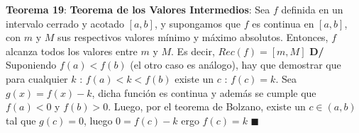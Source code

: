 \documentclass[11pt,a4paper]{article}
\newcommand*{\QEDA}{\null\nobreak\hfill\ensuremath{\blacksquare}}
\begin{document}
\noindent \textbf{Teorema 19}: \textbf{Teorema de los Valores Intermedios}: Sea $f$ definida en un intervalo cerrado y acotado $[a,b]$, y supongamos que $f$ es continua en $[a,b]$, con $m$ y $M$ sus respectivos valores m\'inimo y m\'aximo absolutos. Entonces, $f$ alcanza todos los valores entre $m$ y $M$. Es decir, $Rec(f) = [m,M]$
\textbf{D/} Suponiendo $f(a) < f(b)$ (el otro caso es an\'alogo), hay que demostrar que para cualquier $k$ : $f(a) < k < f(b)$ existe un $c$ : $f(c) = k$. Sea $g(x) = f(x) - k$, dicha funci\'on es continua y adem\'as se cumple que $f(a) < 0$ y $f(b) > 0$. Luego, por el teorema de Bolzano, existe un $c \in (a,b)$ tal que $g(c) = 0$, luego $0 = f(c) - k$ ergo $f(c) = k$ \QEDA
\end{document}
